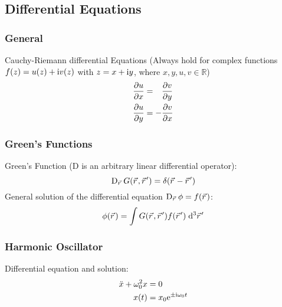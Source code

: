 	\subsection{Differential Equations}
		\subsubsection{General}
			\noindent
			Cauchy-Riemann differential Equations (Always hold for complex functions $f(z)=u(z)+\mathrm{i} v(z)$ with $z=x+\mathrm{i} y$, where $x,y,u,v\in\mathbb{R}$)
			\begin{equation}
				\begin{aligned}
					\pdv{u}{x} &= \phantom{-}\pdv{v}{y} \\
					\pdv{u}{y} &= -\pdv{v}{x} \\
				\end{aligned}
			\end{equation}


		\subsubsection{Green's Functions}
			\noindent
			Green's Function ($\mathrm{D}$ is an arbitrary linear differential operator):
			\begin{equation}
				\mathrm{D}_{\vec{r}}\, G\qty(\vec{r},\vec{r}') = \delta\qty(\vec{r} - \vec{r}')
			\end{equation}
			General solution of the differential equation $\mathrm{D}_{\vec{r}}\, \phi = f\qty(\vec{r})$:
			\begin{equation}
				\phi\qty(\vec{r}) = \int G\qty(\vec{r},\vec{r}')f\qty(\vec{r}')\;\dd^3\vec{r}'
			\end{equation}

		\subsubsection{Harmonic Oscillator}
			\noindent
			Differential equation and solution:
			\begin{equation}
				\begin{aligned}
					\ddot{x}+\omega_0^2 x &= 0 \\
					x(t) &= x_0 \mathrm{e}^{\pm \mathrm{i}\omega_0 t}
				\end{aligned}
			\end{equation}

